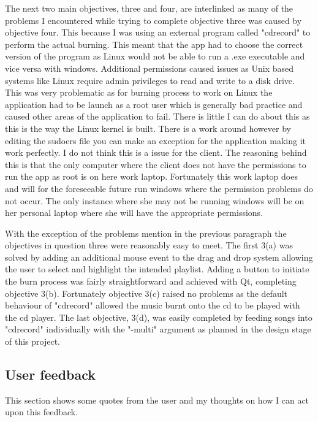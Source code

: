 \documentclass{article}
\begin{document}
The next two main objectives, three and four, are interlinked as many of the problems I encountered
while trying to complete objective three was caused by objective four. This because I was using an
external program called "cdrecord" to perform the actual burning. This meant that the app had to
choose the correct version of the program as Linux would not be able to run a .exe executable and
vice versa with windows. Additional permissions caused issues as Unix based systems like Linux require
admin privileges to read and write to a disk drive. This was very problematic as for burning process
to work on Linux the application had to be launch as a root user which is generally bad practice and
caused other areas of the application to fail. There is little I can do about this as this is the way
the Linux kernel is built. There is a work around however by editing the sudoers file you can make
an exception for the application making it work perfectly. I do not think this is a issue for the
client. The reasoning behind this is that the only computer where the client does not have the
permissions to run the app as root is on here work laptop. Fortunately this work laptop does and will
for the foreseeable future run windows where the permission problems do not occur. The only instance
where she may not be running windows will be on her personal laptop where she will have the appropriate
permissions.

With the exception of the problems mention in the previous paragraph the objectives in question three
were reasonably easy to meet. The first 3(a) was solved by adding an additional mouse event to the
drag and drop system allowing the user to select and highlight the intended playlist. Adding
a button to initiate the burn process was fairly straightforward and achieved with Qt, completing
objective 3(b). Fortunately objective 3(c) raised no problems as the default behaviour of "cdrecord"
allowed the music burnt onto the cd to be played with the cd player. The last objective, 3(d), was
easily completed by feeding songs into "cdrecord" individually with the "-multi" argument as planned
in the design stage of this project.


\subsection{User feedback}
This section shows some quotes from the user and my thoughts on how I can act upon this feedback.
\end{document}
